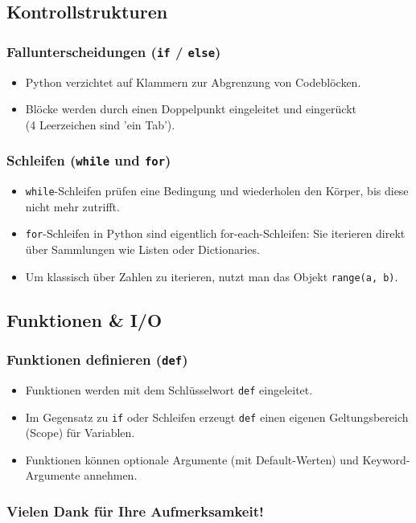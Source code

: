 \subsection{Kontrollstrukturen}

\begin{frame}
  \frametitle{Fallunterscheidungen (\texttt{if} / \texttt{else})}
  \begin{itemize}[<+->]
  \item Python verzichtet auf Klammern zur Abgrenzung von Codeblöcken.
  \item Blöcke werden durch einen Doppelpunkt eingeleitet und eingerückt\\ (4 Leerzeichen sind 'ein Tab').
  \end{itemize}
\end{frame}

\begin{frame}
  \frametitle{Schleifen (\texttt{while} und \texttt{for})}
  \begin{itemize}[<+->]
  \item \texttt{while}-Schleifen prüfen eine Bedingung und wiederholen den Körper, bis diese nicht mehr zutrifft.
  \item \texttt{for}-Schleifen in Python sind eigentlich for-each-Schleifen: Sie iterieren direkt über Sammlungen wie Listen oder Dictionaries.
  \item Um klassisch über Zahlen zu iterieren, nutzt man das Objekt \texttt{range(a, b)}.
  \end{itemize}
\end{frame}

\subsection{Funktionen \& I/O}

\begin{frame}
  \frametitle{Funktionen definieren (\texttt{def})}
  \begin{itemize}[<+->]
  \item Funktionen werden mit dem Schlüsselwort \texttt{def} eingeleitet.
  \item Im Gegensatz zu \texttt{if} oder Schleifen erzeugt \texttt{def} einen eigenen Geltungsbereich (Scope) für Variablen.
  \item Funktionen können optionale Argumente (mit Default-Werten) und Keyword-Argumente annehmen.
  \end{itemize}
\end{frame}

\begin{frame}[separator]
  \frametitle{Vielen Dank für Ihre Aufmerksamkeit!}
\end{frame}



